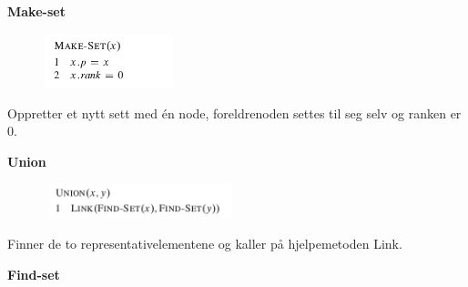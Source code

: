 \documentclass[12pt]{report}
\begin{document}
\vspace{\baselineskip}
\textbf{Make-set}\par




\begin{figure}[H]
	\begin{Center}
		\includegraphics[width=1.48in,height=0.62in]{./media/image115.png}
	\end{Center}
\end{figure}



\par

Oppretter et nytt sett med én node, foreldrenoden settes til seg selv og ranken er 0.\par


\vspace{\baselineskip}
\textbf{Union}\par




\begin{figure}[H]
	\begin{Center}
		\includegraphics[width=2.23in,height=0.4in]{./media/image116.png}
	\end{Center}
\end{figure}



\par

Finner de to representativelementene og kaller på hjelpemetoden Link.\par


\vspace{\baselineskip}
\textbf{Find-set}\par
\end{document}
